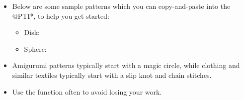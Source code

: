 \documentclass[main.tex]{subfiles}
\begin{document}
\begin{itemize}
\item Below are some sample patterns which you can copy-and-paste into the @PTI*, to help you get started:
    \begin{itemize}
    \item Disk: \\

    \item Sphere: \\
    \end{itemize}

\item Amigurumi patterns typically start with a magic circle, while clothing and similar textiles typically start with a slip knot and chain stitches.
\item Use the  function often to avoid losing your work.
\end{itemize}
\end{document}
